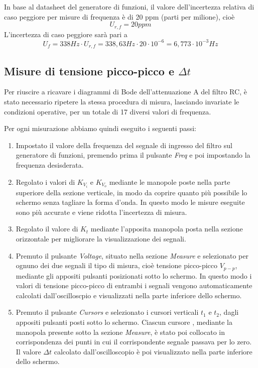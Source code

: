 In base al datasheet del generatore di funzioni, il valore dell'incertezza relativa di caso peggiore per misure di frequenza è di 20 ppm (parti per milione), cioè 
\[U_{r,f} = 20 ppm\]
L'incertezza di caso peggiore sarà pari a
\[U_f = 338 Hz\cdot U_{r,f} = 338,63Hz \cdot 20 \cdot 10^{-6} = 6,773\cdot10^{-3}Hz\]


\subsection{Misure di tensione picco-picco e $\Delta t$}
Per riuscire a ricavare i diagrammi di Bode dell'attenuazione A del filtro RC, è stato necessario ripetere la stessa procedura di misura, lasciando invariate le condizioni operative, per un totale di 17 diversi valori di frequenza.

Per ogni misurazione abbiamo quindi eseguito i seguenti passi:
\begin{enumerate}
    \item Impostato il valore della frequenza del segnale di ingresso del filtro  sul generatore di funzioni, premendo prima il pulsante \emph{Freq} e poi impostando la frequenza desisderata.
    \item Regolato i valori di $K_{V_i}$ e $K_{V_o}$ mediante le manopole poste nella parte superiore della sezione verticale, in modo da coprire quanto più possibile lo schermo senza tagliare la forma d'onda. In questo modo le misure eseguite sono più accurate e viene ridotta l'incertezza di misura.
    \item Regolato il valore di $K_t$ mediante l'apposita manopola posta nella sezione orizzontale per migliorare la visualizzazione dei segnali.
    \item Premuto il pulsante \emph{Voltage}, situato nella sezione \emph{Measure} e selezionato per ognuno dei due segnali il tipo di misura, cioè tensione picco-picco $V_{p-p}$, mediante gli appositi pulsanti posizionati sotto lo schermo.
    In questo modo i valori di tensione picco-picco di entrambi i segnali vengono automaticamente calcolati dall'oscilloscpio e visualizzati nella parte inferiore dello schermo.
    \item Premuto il pulsante \emph{Cursors} e selezionato i cursori verticali $t_1$ e $t_2$, dagli appositi pulsanti posti sotto lo schermo. Ciascun cursore , mediante la manopola presente sotto la sezione \emph{Measure}, è stato poi collocato in corrispondenza dei punti in cui il corrispondente segnale passava per lo zero. Il valore $\Delta t$  calcolato dall'oscilloscopio è poi visualizzato nella parte inferiore dello schermo. 
    
\end{enumerate}

